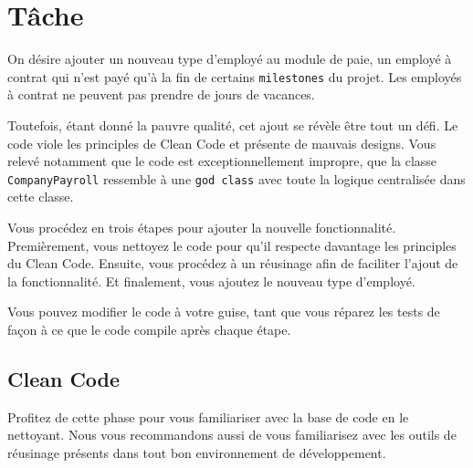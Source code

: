 \documentclass[french]{article}
\begin{document}
\section{Tâche}
On désire ajouter un nouveau type d'employé au module de paie, un employé à contrat qui n'est payé qu'à la fin de certains \texttt{milestones} du projet. Les employés à contrat ne peuvent pas prendre de jours de vacances.

Toutefois, étant donné la pauvre qualité, cet ajout se révèle être tout un défi. Le code viole les principles de Clean Code et présente de mauvais designs. Vous relevé notamment que le code est exceptionnellement impropre, que la classe \texttt{CompanyPayroll} ressemble à une \texttt{god class} avec toute la logique centralisée dans cette classe.

Vous procédez en trois étapes pour ajouter la nouvelle fonctionnalité. Premièrement, vous nettoyez le code pour qu'il respecte davantage les principles du Clean Code. Ensuite, vous procédez à un réusinage afin de faciliter l'ajout de la fonctionnalité. Et finalement, vous ajoutez le nouveau type d'employé.

Vous pouvez modifier le code à votre guise, tant que vous réparez les tests de façon à ce que le code compile après chaque étape.

\subsection{Clean Code}

Profitez de cette phase pour vous familiariser avec la base de code en le nettoyant. Nous vous recommandons aussi de vous familiarisez avec les outils de réusinage présents dans tout bon environnement de développement.


\end{document}
